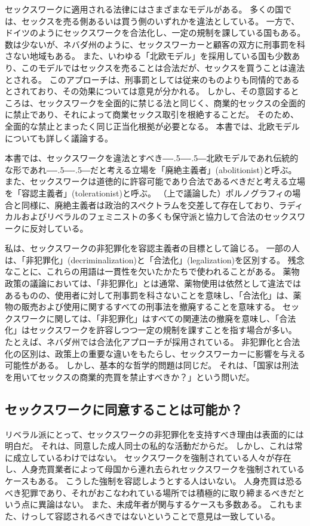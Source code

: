\documentclass[paper=a4,book,openany]{jlreq}
\def\DDASH{―\kern-.5\zw―\kern-.5\zw―} %
\begin{document}
セックスワークに適用される法律にはさまざまなモデルがある。
多くの国では、セックスを売る側あるいは買う側のいずれかを違法としている。
一方で、ドイツのようにセックスワークを合法化し、一定の規制を課している国もある。
数は少ないが、ネバダ州のように、セックスワーカーと顧客の双方に刑事罰を科さない地域もある。
また、いわゆる「北欧モデル」を採用している国も少数あり、このモデルではセックスを売ることは合法だが、セックスを買うことは違法とされる。
このアプローチは、刑事罰としては従来のものよりも同情的であるとされており、その効果については意見が分かれる。
しかし、その意図するところは、セックスワークを全面的に禁じる法と同じく、商業的セックスの全面的に禁止であり、それによって商業セックス取引を根絶することだ。
そのため、全面的な禁止とまったく同じ正当化根拠が必要となる。
本書では、北欧モデルについても詳しく議論する。

本書では、セックスワークを違法とすべき{\DDASH}北欧モデルであれ伝統的な形であれ{\DDASH}だと考える立場を「廃絶主義者」(abolitionist)と呼ぶ。
また、セックスワークは道徳的に許容可能であり合法であるべきだと考える立場を「容認主義者」(tolerationist)と呼ぶ。
（上で議論した）ポルノグラフィの場合と同様に、廃絶主義者は政治的スペクトラムを交差して存在しており、ラディカルおよびリベラルのフェミニストの多くも保守派と協力して合法のセックスワークに反対している。

私は、セックスワークの非犯罪化を容認主義者の目標として論じる。
一部の人は、「非犯罪化」(decriminalization)と「合法化」(legalization)を区別する。
残念なことに、これらの用語は一貫性を欠いたかたちで使われることがある。
薬物政策の議論においては、「非犯罪化」とは通常、薬物使用は依然として違法ではあるものの、使用者に対して刑事罰を科さないことを意味し、「合法化」は、薬物の販売および使用に関するすべての刑事法を撤廃することを意味する。
セックスワークに関しては、「非犯罪化」はすべての関連法の撤廃を意味し、「合法化」はセックスワークを許容しつつ一定の規制を課すことを指す場合が多い。
たとえば、ネバダ州では合法化アプローチが採用されている。
非犯罪化と合法化の区別は、政策上の重要な違いをもたらし、セックスワーカーに影響を与える可能性がある。
しかし、基本的な哲学的問題は同じだ。
それは、「国家は刑法を用いてセックスの商業的売買を禁止すべきか？」という問いだ\citep{tani15:_sex_worker_explain_differ_legal_decrim_prost}。

\subsection{セックスワークに同意することは可能か？}

リベラル派にとって、セックスワークの非犯罪化を支持すべき理由は表面的には明白だ。
それは、同意した成人同士の私的な活動だからだ。
しかし、これは常に成立しているわけではない。
セックスワークを強制されている人々が存在し、人身売買業者によって母国から連れ去られセックスワークを強制されているケースもある。
こうした強制を容認しようとする人はいない。
人身売買は恐るべき犯罪であり、それがおこなわれている場所では積極的に取り締まるべきだという点に異論はない。
また、未成年者が関与するケースも多数ある。
これもまた、けっして容認されるべきではないということで意見は一致している。
\end{document}

